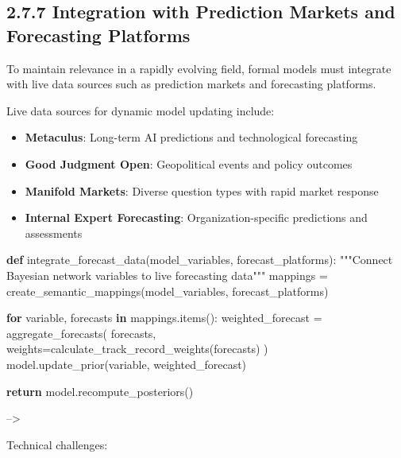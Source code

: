 \documentclass[
  11pt,
  letterpaper,
]{book}
\newenvironment{Shaded}{\begin{snugshade}}{\end{snugshade}}
\newcommand{\CommentTok}[1]{\textcolor[rgb]{0.37,0.37,0.37}{#1}}
\newcommand{\ControlFlowTok}[1]{\textcolor[rgb]{0.00,0.23,0.31}{\textbf{#1}}}
\newcommand{\KeywordTok}[1]{\textcolor[rgb]{0.00,0.23,0.31}{\textbf{#1}}}
\newcommand{\NormalTok}[1]{\textcolor[rgb]{0.00,0.23,0.31}{#1}}
\newcommand{\OperatorTok}[1]{\textcolor[rgb]{0.37,0.37,0.37}{#1}}
\providecommand{\tightlist}{%
  \setlength{\itemsep}{0pt}\setlength{\parskip}{0pt}}
\begin{document}
\subsection*{2.7.7 Integration with Prediction Markets and Forecasting
Platforms}\label{sec-prediction-markets}

To maintain relevance in a rapidly evolving field, formal models must
integrate with live data sources such as prediction markets and
forecasting platforms.

Live data sources for dynamic model updating include:

\begin{itemize}
\tightlist
\item
  \textbf{Metaculus}: Long-term AI predictions and technological
  forecasting
\item
  \textbf{Good Judgment Open}: Geopolitical events and policy outcomes
\item
  \textbf{Manifold Markets}: Diverse question types with rapid market
  response
\item
  \textbf{Internal Expert Forecasting}: Organization-specific
  predictions and assessments
\end{itemize}

\begin{Shaded}
\begin{Highlighting}[]
\KeywordTok{def}\NormalTok{ integrate\_forecast\_data(model\_variables, forecast\_platforms):}
    \CommentTok{"""Connect Bayesian network variables to live forecasting data"""}
\NormalTok{    mappings }\OperatorTok{=}\NormalTok{ create\_semantic\_mappings(model\_variables, forecast\_platforms)}
    
    \ControlFlowTok{for}\NormalTok{ variable, forecasts }\KeywordTok{in}\NormalTok{ mappings.items():}
\NormalTok{        weighted\_forecast }\OperatorTok{=}\NormalTok{ aggregate\_forecasts(}
\NormalTok{            forecasts, }
\NormalTok{            weights}\OperatorTok{=}\NormalTok{calculate\_track\_record\_weights(forecasts)}
\NormalTok{        )}
\NormalTok{        model.update\_prior(variable, weighted\_forecast)}
    
    \ControlFlowTok{return}\NormalTok{ model.recompute\_posteriors()}
\end{Highlighting}
\end{Shaded}

--\textgreater{}

Technical challenges:
\end{document}
